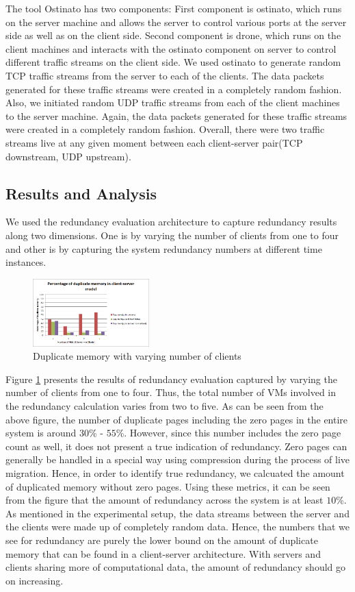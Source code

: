 \documentclass{acm_proc_article-sp}
\begin{document}
The tool Ostinato has two components: First component is ostinato, which runs on the server machine and allows the server to control various ports at the server side as well as on the client side. Second component is drone, which runs on the client machines and interacts with the ostinato component on server to control different traffic streams on the client side. We used ostinato to generate random TCP traffic streams from the server to each of the clients. The data packets generated for these traffic streams were created in a completely random fashion. Also, we initiated random UDP traffic streams from each of the client machines to the server machine. Again, the data packets generated for these traffic streams were created in a completely random fashion. Overall, there were two traffic streams live at any given moment between each client-server pair(TCP downstream, UDP upstream).

\subsection{Results and Analysis}
We used the redundancy evaluation architecture to capture redundancy results along two dimensions. One is by varying the number of clients from one to four and other is by capturing the system redundancy numbers at different time instances.

\begin{figure}[htbp]
\centering
        \includegraphics[width=0.4\textwidth]{images/client-server1.png}
    \caption{Duplicate memory with varying number of clients}
    \label{fig:client-server1}
\end{figure}

Figure \ref{fig:client-server1} presents the results of redundancy evaluation captured by varying the number of clients from one to four. Thus, the total number of VMs involved in the redundancy calculation varies from two to five. As can be seen from the above figure, the number of duplicate pages including the zero pages in the entire system is around $30$\% - $55$\%.	However, since this number includes the zero page count as well, it does not present a true indication of redundancy. Zero pages can generally be handled in a special way using compression during the process of live migration. Hence, in order to identify true redundancy, we calcuated the amount of duplicated memory without zero pages. Using these metrics, it can be seen from the figure that the amount of redundancy across the system is at least $10$\%. As mentioned in the experimental setup, the data streams between the server and the clients were made up of completely random data. Hence, the numbers that we see for redundancy are purely the lower bound on the amount of duplicate memory that can be found in a client-server architecture. With servers and clients sharing more of computational data, the amount of redundancy should go on increasing.
\end{document}
